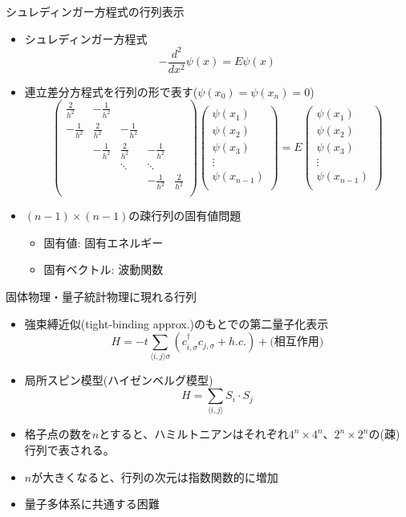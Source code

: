 \begin{frame}[t,fragile]{シュレディンガー方程式の行列表示}
  \begin{itemize}
  \item シュレディンガー方程式
    \[
    -\frac{d^2}{dx^2}\psi(x) = E \psi(x)
    \]
  \item 連立差分方程式を行列の形で表す($\psi(x_0)=\psi(x_n)=0$)
    \[
    \begin{pmatrix}
      \frac{2}{h^2} & -\frac{1}{h^2} \\
      -\frac{1}{h^2} & \frac{2}{h^2} & -\frac{1}{h^2} \\
      & -\frac{1}{h^2} & \frac{2}{h^2} & -\frac{1}{h^2} \\
      & & \ddots & \ddots \\
      & & & -\frac{1}{h^2} & \frac{2}{h^2} \\
    \end{pmatrix}
    \begin{pmatrix}
      \psi(x_1) \\
      \psi(x_2) \\
      \psi(x_3) \\
      \vdots \\
      \psi(x_{n-1}) \\
    \end{pmatrix}
    = E
    \begin{pmatrix}
      \psi(x_1) \\
      \psi(x_2) \\
      \psi(x_3) \\
      \vdots \\
      \psi(x_{n-1}) \\
    \end{pmatrix}
    \]
  \item $(n-1) \times (n-1)$の疎行列の固有値問題
    \begin{itemize}
    \item 固有値: 固有エネルギー
    \item 固有ベクトル: 波動関数
    \end{itemize}
  \end{itemize}
\end{frame}

\begin{frame}[t,fragile]{固体物理・量子統計物理に現れる行列}
  \begin{itemize}
  \item 強束縛近似(tight-binding approx.)のもとでの第二量子化表示
    \[
    H = -t \sum_{\langle i,j \rangle \sigma} (c_{i,\sigma}^\dagger c_{j,\sigma} + h.c.) + \text{(相互作用)}
    \]
  \item 局所スピン模型(ハイゼンベルグ模型)
    \[
    H = \sum_{\langle i,j \rangle} S_i \cdot S_j
    \]
  \item 格子点の数を$n$とすると、ハミルトニアンはそれぞれ$4^n \times 4^n$、$2^n \times 2^n$の(疎)行列で表される。
  \item $n$が大きくなると、行列の次元は指数関数的に増加
  \item 量子多体系に共通する困難
  \end{itemize}
\end{frame}

